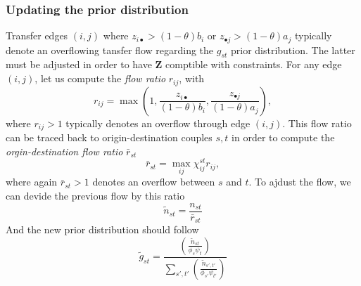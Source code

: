 \documentclass{bmcart}
\begin{document}
{\subsubsection{Updating the prior distribution}
\label{priorup}
Transfer edges $(i, j)$ where $z_{i \bullet} > (1 - \theta)b_i$ or $z_{\bullet j} > (1 - \theta)a_j$ typically denote an overflowing tansfer flow regarding the $g_{st}$ prior distribution.  The latter must be adjusted in order to have $\mathbf{Z}$ comptible with constraints. For any edge $(i, j)$, let us compute the \emph{flow ratio} $r_{ij}$, with 
\begin{equation}
	\label{flow_ratio}
	r_{ij} = \max \left(1, \frac{z_{i \bullet}}{(1 - \theta)b_i}, \frac{z_{\bullet j}}{(1 - \theta)a_j} \right),
\end{equation}
where $r_{ij} > 1$ typically denotes an overflow through edge $(i, j)$. This flow ratio can be traced back to origin-destination couples $s, t$ in order to compute the \emph{orgin-destination flow ratio} $\bar{r}_{st}$ 
\begin{equation}
	\label{st_flow_ratio}
	\bar{r}_{st} = \max_{ij} \chi_{ij}^{st} r_{ij},
\end{equation}
where again $\bar{r}_{st} > 1$ denotes an overflow between $s$ and $t$. To ajdust the flow, we can devide the previous flow by this ratio
\begin{equation}
	\label{update_flow}
	\widetilde{n}_{st} =\frac{n_{st}}{\bar{r}_{st}}
\end{equation}
And the new prior distribution should follow 
\begin{equation}
	\label{update_distrib}
	\widetilde{g}_{st} = \frac{\left( \frac{\widetilde{n}_{st}}{\phi_s \psi_t} \right)}{\sum_{s',t'} \left( \frac{\widetilde{n}_{s',t'}}{\phi_{s'} \psi_{t'}} \right)}
\end{equation}


}
\end{document}
